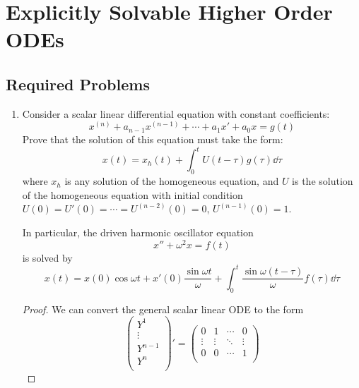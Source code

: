 \documentclass[../psets.tex]{subfiles}
\begin{document}
\section{Explicitly Solvable Higher Order ODEs}
\subsection*{Required Problems}
\begin{enumerate}
    \item {}Consider a scalar linear differential equation with constant coefficients:
    \begin{equation*}
        x^{(n)}+a_{n-1}x^{(n-1)}+\cdots+a_1x'+a_0x = g(t)
    \end{equation*}
    Prove that the solution of this equation must take the form:
    \begin{equation*}
        x(t) = x_h(t)+\int_0^tU(t-\tau)g(\tau)\dd\tau
    \end{equation*}
    where $x_h$ is any solution of the homogeneous equation, and $U$ is the solution of the homogeneous equation with initial condition $U(0)=U'(0)=\cdots=U^{(n-2)}(0)=0$, $U^{(n-1)}(0)=1$.\par
    In particular, the driven harmonic oscillator equation
    \begin{equation*}
        x''+\omega^2x = f(t)
    \end{equation*}
    is solved by
    \begin{equation*}
        x(t) = x(0)\cos\omega t+x'(0)\frac{\sin\omega t}{\omega}+\int_0^t\frac{\sin\omega(t-\tau)}{\omega}f(\tau)\dd\tau
    \end{equation*}
    \begin{proof}
        We can convert the general scalar linear ODE to the form
        \begin{equation*}
            \begin{pmatrix}
                Y^1\\
                \vdots\\
                Y^{n-1}\\
                Y^n\\
            \end{pmatrix}'
            =
            \begin{pmatrix}
                0 & 1 & \cdots & 0\\
                \vdots & \vdots & \ddots & \vdots\\
                0 & 0 & \cdots & 1\\

\end{pmatrix}
\end{equation*}
\end{proof}
\end{enumerate}
\end{document}
